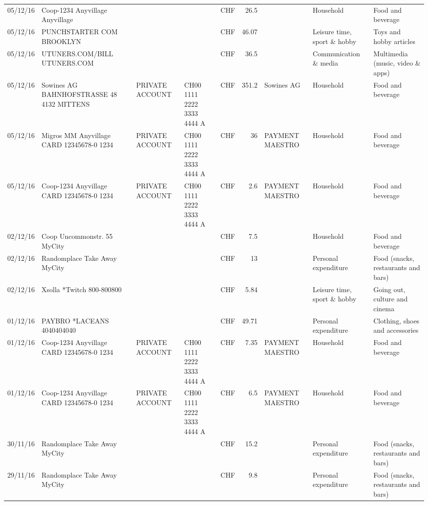 \begin{landscape}
\begin{table}[h]
\begin{center}
\begin{tabular}{rllllrlll}
		05/12/16 & Coop-1234 Anyvillage    Anyvillage &       &       & CHF   & 26.5  &       & Household & Food and beverage \\
		05/12/16 & PUNCHSTARTER COM          BROOKLYN &       &       & CHF   & 46.07 &       & Leisure time, sport \& hobby & Toys and hobby articles \\
		05/12/16 & UTUNERS.COM/BILL          UTUNERS.COM &       &       & CHF   & 36.5  &       & Communication \& media & Multimedia (music, video \& apps) \\
		05/12/16 & Sowines AG BAHNHOFSTRASSE 48 4132 MITTENS & PRIVATE ACCOUNT & CH00 1111 2222 3333 4444 A & CHF   & 351.2 & Sowines AG & Household & Food and beverage \\
		05/12/16 & Migros MM Anyvillage CARD 12345678-0 1234 & PRIVATE ACCOUNT & CH00 1111 2222 3333 4444 A & CHF   & 36    & PAYMENT MAESTRO & Household & Food and beverage \\
		05/12/16 & Coop-1234 Anyvillage CARD 12345678-0 1234 & PRIVATE ACCOUNT & CH00 1111 2222 3333 4444 A & CHF   & 2.6   & PAYMENT MAESTRO & Household & Food and beverage \\
		02/12/16 & Coop Uncommonstr. 55   MyCity &       &       & CHF   & 7.5   &       & Household & Food and beverage \\
		02/12/16 & Randomplace Take Away     MyCity &       &       & CHF   & 13    &       & Personal expenditure & Food (snacks, restaurants and bars) \\
		02/12/16 & Xsolla *Twitch           800-800800 &       &       & CHF   & 5.84  &       & Leisure time, sport \& hobby & Going out, culture and cinema \\
		01/12/16 & PAYBRO *LACEANS      4040404040 &       &       & CHF   & 49.71 &       & Personal expenditure & Clothing, shoes and accessories \\
		01/12/16 & Coop-1234 Anyvillage CARD 12345678-0 1234 & PRIVATE ACCOUNT & CH00 1111 2222 3333 4444 A & CHF   & 7.35  & PAYMENT MAESTRO & Household & Food and beverage \\
		01/12/16 & Coop-1234 Anyvillage CARD 12345678-0 1234 & PRIVATE ACCOUNT & CH00 1111 2222 3333 4444 A & CHF   & 6.5   & PAYMENT MAESTRO & Household & Food and beverage \\
		30/11/16 & Randomplace Take Away     MyCity &       &       & CHF   & 15.2  &       & Personal expenditure & Food (snacks, restaurants and bars) \\
		29/11/16 & Randomplace Take Away     MyCity &       &       & CHF   & 9.8   &       & Personal expenditure & Food (snacks, restaurants and bars) \\

\end{tabular}
\end{center}
\end{table}
\end{landscape}
